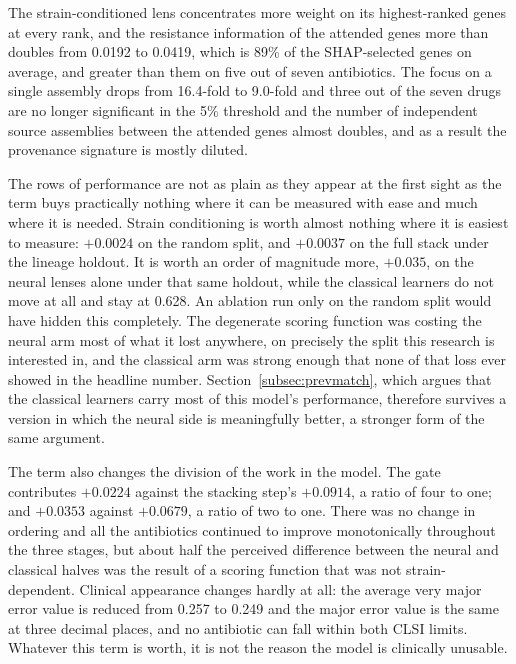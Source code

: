 The strain-conditioned lens
concentrates more weight on its highest-ranked genes at every rank, and the
resistance information of the
attended genes more than doubles from 0.0192 to 0.0419, which is 89\% of the SHAP-selected genes
on average, and greater than them on five out of seven antibiotics. The focus on a
single assembly drops from 16.4-fold to 9.0-fold and three out of the seven drugs are no longer
significant in the 5\% threshold and the number of independent source assemblies between the
attended genes almost doubles, and as a result the provenance signature is mostly diluted.

\vspace{1em}

The rows of performance are not as plain as they appear at the first sight as the term buys
practically nothing where it can be measured with ease and much where it is needed. Strain conditioning is
worth almost nothing where it is easiest to measure: $+0.0024$ on the random split, and
$+0.0037$ on the full stack under the lineage holdout. It is worth an order of magnitude more,
$+0.035$, on the neural lenses alone under that same holdout, while the classical learners do
not move at all and stay at 0.628. An ablation run only on the random split would have hidden
this completely. The degenerate scoring function was costing the neural arm most of what it
lost anywhere, on precisely the split this research is interested in, and the classical arm was
strong enough that none of that loss ever showed in the headline number. Section~\ref{subsec:prevmatch}, which argues that
the classical learners carry most of this model's performance, therefore survives a version in
which the neural side is meaningfully better, a stronger form of the same argument.

\vspace{1em}

The term also changes the division of the work in the model. The gate contributes $+0.0224$
against the stacking step's $+0.0914$, a ratio of four to one; and $+0.0353$ against $+0.0679$, a
ratio of two to one. There was no change in ordering and all the antibiotics continued to improve
monotonically throughout the three stages, but about half the perceived difference between the
neural and classical halves was the result of a scoring function that was not strain-dependent.
Clinical appearance changes hardly at all: the average very major error value is reduced from
0.257 to 0.249 and the major error value is the same at three decimal places, and no antibiotic can fall
within both CLSI limits. Whatever this term is worth, it is not the reason the model is
clinically unusable.

